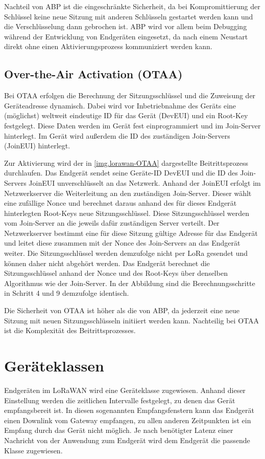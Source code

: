 Nachteil von \gls{ABP} ist die eingeschränkte Sicherheit, da bei Kompromittierung der Schlüssel keine neue Sitzung mit anderen Schlüsseln gestartet werden kann und die Verschlüsselung dann gebrochen ist.
\gls{ABP} wird vor allem beim Debugging während der Entwicklung von Endgeräten eingesetzt, da nach einem Neustart direkt ohne einen Aktivierungsprozess kommuniziert werden kann.


\subsection{Over-the-Air Activation (OTAA)}
Bei \gls{OTAA} erfolgen die Berechnung der Sitzungsschlüssel und die Zuweisung der Geräteadresse dynamisch.
Dabei wird vor Inbetriebnahme des Geräts eine (möglichst) weltweit eindeutige ID für das Gerät (DevEUI) und ein Root-Key festgelegt.
Diese Daten werden im Gerät fest einprogrammiert und im Join-Server hinterlegt.
Im Gerät wird außerdem die ID des zuständigen Join-Servers (JoinEUI) hinterlegt.

Zur Aktivierung wird der in \autoref{img.lorawan-OTAA} dargestellte Beitrittsprozess durchlaufen.
Das Endgerät sendet seine Geräte-ID DevEUI und die ID des Join-Servers JoinEUI unverschlüsselt an das Netzwerk.
Anhand der JoinEUI erfolgt im Netzwerkserver die Weiterleitung an den zuständigen Join-Server.
Dieser wählt eine zufällige Nonce und berechnet daraus anhand des für dieses Endgerät hinterlegten Root-Keys neue Sitzungsschlüssel.
Diese Sitzungsschlüssel werden vom Join-Server an die jeweils dafür zuständigen Server verteilt.
Der Netzwerkserver bestimmt eine für diese Sitzung gültige Adresse für das Endgerät und leitet diese zusammen mit der Nonce des Join-Servers an das Endgerät weiter.
Die Sitzungsschlüssel werden demzufolge nicht per LoRa gesendet und können daher nicht abgehört werden.
Das Endgerät berechnet die Sitzungsschlüssel anhand der Nonce und des Root-Keys über denselben Algorithmus wie der Join-Server.
In der Abbildung sind die Berechnungsschritte in Schritt 4 und 9 demzufolge identisch.

Die Sicherheit von \gls{OTAA} ist höher als die von \gls{ABP}, da jederzeit eine neue Sitzung mit neuen Sitzungsschlüsseln initiiert werden kann.
Nachteilig bei \gls{OTAA} ist die Komplexität des Beitrittsprozesses.



\section{Geräteklassen}\label{sec.lorawan.classes}
Endgeräten im LoRaWAN wird eine Geräteklasse zugewiesen.
Anhand dieser Einstellung werden die zeitlichen Intervalle festgelegt, zu denen das Gerät empfangsbereit ist.
In diesen sogenannten Empfangsfenstern kann das Endgerät einen Downlink vom Gateway empfangen, zu allen anderen Zeitpunkten ist ein Empfang durch das Gerät nicht möglich.
Je nach benötigter Latenz einer Nachricht von der Anwendung zum Endgerät wird dem Endgerät die passende Klasse zugewiesen. 
\cite{loraclasses}

